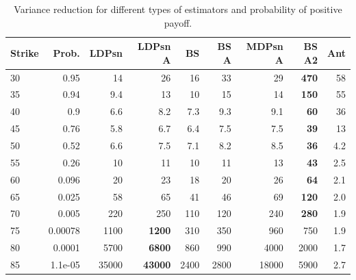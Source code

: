 \begin{table}[H]
\centering
\begin{tabular}{lrrrrrrrr}
\toprule
Strike &   Prob. &  LDPsn &  LDPsn A &   BS &  BS A &  MDPsn A &  BS A2 &  Ant \\
\midrule
30 &    0.95 &     14 &       26 &   16 &    33 &           29  &    \textbf{470} &   58 \\
35 &    0.94 &    9.4 &       13 &   10 &    15 &           14  &    \textbf{150} &   55 \\
40 &     0.9 &    6.6 &      8.2 &  7.3 &   9.3 &          9.1  &     \textbf{60} &   36 \\
45 &    0.76 &    5.8 &      6.7 &  6.4 &   7.5 &          7.5  &     \textbf{39} &   13 \\
50 &    0.52 &    6.6 &      7.5 &  7.1 &   8.2 &          8.5  &     \textbf{36} &  4.2 \\
55 &    0.26 &     10 &       11 &   10 &    11 &           13  &     \textbf{43} &  2.5 \\
60 &   0.096 &     20 &       23 &   18 &    20 &           26  &     \textbf{64} &  2.1 \\
65 &   0.025 &     58 &       65 &   41 &    46 &           69  &    \textbf{120} &  2.0 \\
70 &   0.005 &    220 &      250 &  110 &   120 &          240  &    \textbf{280} &  1.9 \\
75 & 0.00078 &   1100 &     \textbf{1200} &  310 &   350 &          960 &    750 &  1.9 \\
80 &  0.0001 &   5700 &     \textbf{6800} &  860 &   990 &         4000 &   2000 &  1.7 \\
85 & 1.1e-05 &  35000 &    \textbf{43000} & 2400 &  2800 &        18000 &   5900 &  2.7 \\
\bottomrule
\end{tabular}
\bigskip
\caption{Variance reduction for different types of estimators and probability of positive payoff.}\label{tab:VarRedu}
\end{table}

